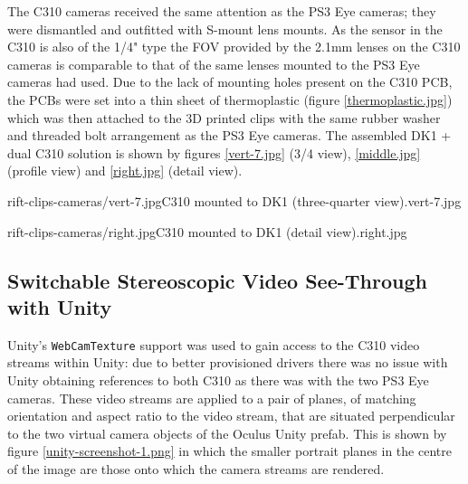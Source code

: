 The C310 cameras received the same attention as the PS3 Eye cameras; they were dismantled and outfitted with S-mount lens mounts. As the sensor in the C310 is also of the 1/4" type the FOV provided by the 2.1mm lenses on the C310 cameras is comparable to that of the same lenses mounted to the PS3 Eye cameras had used. Due to the lack of mounting holes present on the C310 PCB, the PCBs were set into a thin sheet of thermoplastic (figure \ref{thermoplastic.jpg}) which was then attached to the 3D printed clips with the same rubber washer and threaded bolt arrangement as the PS3 Eye cameras. The assembled DK1 + dual C310 solution is shown by figures \ref{vert-7.jpg} (3/4 view), \ref{middle.jpg} (profile view) and \ref{right.jpg} (detail view).

       {rift-clips-cameras/vert-7.jpg}{C310 mounted to DK1 (three-quarter view).}{vert-7.jpg}

       {rift-clips-cameras/right.jpg}{C310 mounted to DK1 (detail view).}{right.jpg}


\subsection{Switchable Stereoscopic Video See-Through with Unity}

Unity's \texttt{WebCamTexture} support was used to gain access to the C310 video streams within Unity: due to better provisioned drivers there was no issue with Unity obtaining references to both C310 as there was with the two PS3 Eye cameras. These video streams are applied to a pair of planes, of matching orientation and aspect ratio to the video stream, that are situated perpendicular to the two virtual camera objects of the Oculus Unity prefab. This is shown by figure \ref{unity-screenshot-1.png} in which the smaller portrait planes in the centre of the image are those onto which the camera streams are rendered.


